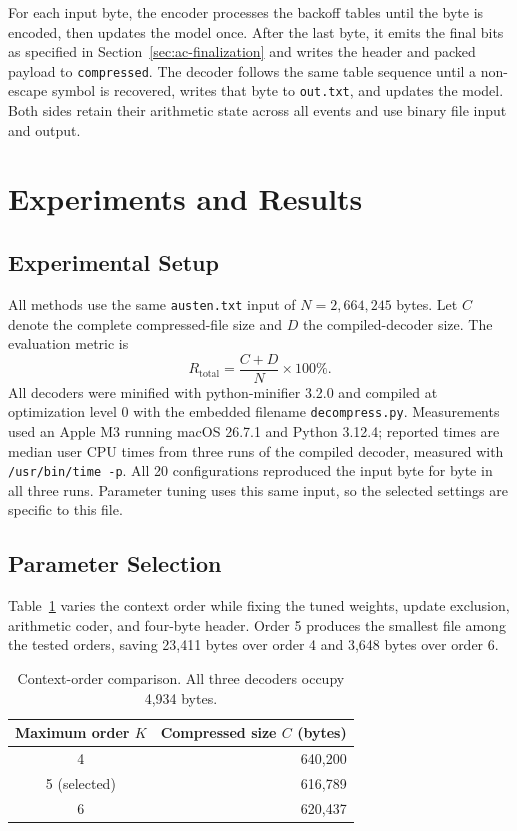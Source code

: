 \documentclass[12pt,onecolumn]{article}
\newcommand{\byte}[1]{\texttt{#1}}
\begin{document}
For each input byte, the encoder processes the backoff tables until the
byte is encoded, then updates the model once. After the last byte, it emits
the final bits as specified in Section~\ref{sec:ac-finalization} and writes
the header and packed payload to \byte{compressed}. The decoder follows
the same table sequence until a non-escape symbol is recovered, writes that
byte to \byte{out.txt}, and updates the model. Both sides retain their
arithmetic state across all events and use binary file input and output.
\FloatBarrier

\section{Experiments and Results}
\label{sec:experiments}

\subsection{Experimental Setup}

All methods use the same \byte{austen.txt} input of $N=2{,}664{,}245$ bytes.
Let $C$ denote the complete compressed-file size and $D$ the compiled-decoder
size. The evaluation metric is
\begin{equation}
  R_{\mathrm{total}}=\frac{C+D}{N}\times100\%.
  \label{eq:total-ratio}
\end{equation}
All decoders were minified with python-minifier 3.2.0 and compiled at
optimization level 0 with the embedded filename \byte{decompress.py}.
Measurements used an Apple M3 running macOS 26.7.1 and Python 3.12.4;
reported times are median user CPU times from three runs of the compiled
decoder, measured with \byte{/usr/bin/time -p}.
All 20 configurations reproduced the input byte for byte in all three runs.
Parameter tuning uses this same input, so the selected settings are
specific to this file.

\subsection{Parameter Selection}

Table~\ref{tab:order-selection} varies the context order while fixing the
tuned weights, update exclusion, arithmetic coder, and four-byte header.
Order 5 produces the smallest file among the tested orders, saving
23,411 bytes over order 4 and 3,648 bytes over order 6.

\begin{table}[htbp]
\centering
\begingroup
{}
\small
\renewcommand{\arraystretch}{1.35}
\begin{tabular}{@{}c r@{}}
\toprule
Maximum order $K$ & Compressed size $C$ (bytes)\\
\midrule
4 & 640,200 \\
5 (selected) & 616,789 \\
6 & 620,437 \\
\bottomrule
\end{tabular}
\endgroup
\caption{Context-order comparison. All three decoders occupy 4,934 bytes.}
\label{tab:order-selection}
\end{table}
\end{document}

